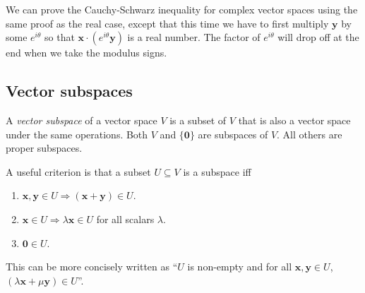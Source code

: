 \documentclass[a4paper]{article}
\begin{document}
We can prove the Cauchy-Schwarz inequality for complex vector spaces using the same proof as the real case, except that this time we have to first multiply $\mathbf{y}$ by some $e^{i\theta}$ so that $\mathbf{x} \cdot (e^{i\theta} \mathbf{y})$ is a real number. The factor of $e^{i\theta}$ will drop off at the end when we take the modulus signs.

\subsection{Vector subspaces}
\begin{defi}
  A \emph{vector subspace} of a vector space $V$ is a subset of $V$ that is also a vector space under the same operations. Both $V$ and $\{\mathbf{0}\}$ are subspaces of $V$. All others are proper subspaces.

  A useful criterion is that a subset $U\subseteq V$ is a subspace iff
  \begin{enumerate}
    \item $\mathbf{x, y}\in U \Rightarrow (\mathbf{x + y}) \in U$.
    \item $\mathbf{x}\in U \Rightarrow \lambda\mathbf{x} \in U$ for all scalars $\lambda$.
    \item $\mathbf{0}\in U$.
  \end{enumerate}
  This can be more concisely written as ``$U$ is non-empty and for all $\mathbf{x, y}\in U$, $(\lambda\mathbf{x} + \mu\mathbf{y})\in U$''.
\end{defi}
\end{document}
